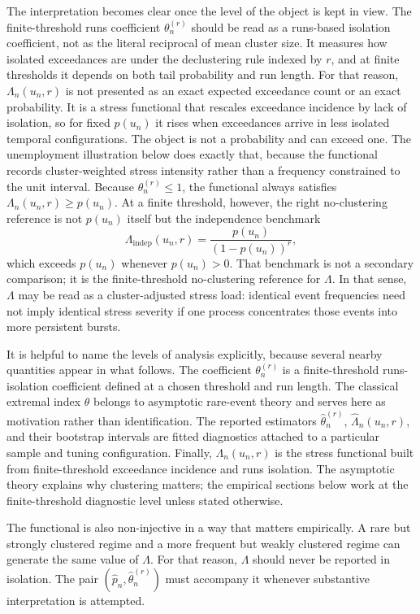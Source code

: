 \documentclass[11pt]{article}
\begin{document}
The interpretation becomes clear once the level of the object is kept in view. The finite-threshold runs coefficient $\theta_n^{(r)}$ should be read as a runs-based isolation coefficient, not as the literal reciprocal of mean cluster size. It measures how isolated exceedances are under the declustering rule indexed by $r$, and at finite thresholds it depends on both tail probability and run length. For that reason, $\Lambda_n(u_n,r)$ is not presented as an exact expected exceedance count or an exact probability. It is a stress functional that rescales exceedance incidence by lack of isolation, so for fixed $p(u_n)$ it rises when exceedances arrive in less isolated temporal configurations. The object is not a probability and can exceed one. The unemployment illustration below does exactly that, because the functional records cluster-weighted stress intensity rather than a frequency constrained to the unit interval. Because $\theta_n^{(r)} \le 1$, the functional always satisfies $\Lambda_n(u_n,r)\ge p(u_n)$. At a finite threshold, however, the right no-clustering reference is not $p(u_n)$ itself but the independence benchmark
\[
\Lambda_{\mathrm{indep}}(u_n,r)=\frac{p(u_n)}{(1-p(u_n))^r},
\]
which exceeds $p(u_n)$ whenever $p(u_n)>0$. That benchmark is not a secondary comparison; it is the finite-threshold no-clustering reference for $\Lambda$. In that sense, $\Lambda$ may be read as a cluster-adjusted stress load: identical event frequencies need not imply identical stress severity if one process concentrates those events into more persistent bursts.

It is helpful to name the levels of analysis explicitly, because several nearby quantities appear in what follows. The coefficient $\theta_n^{(r)}$ is a finite-threshold runs-isolation coefficient defined at a chosen threshold and run length. The classical extremal index $\theta$ belongs to asymptotic rare-event theory and serves here as motivation rather than identification. The reported estimators $\widehat{\theta}_n^{(r)}$, $\widehat{\Lambda}_n(u_n,r)$, and their bootstrap intervals are fitted diagnostics attached to a particular sample and tuning configuration. Finally, $\Lambda_n(u_n,r)$ is the stress functional built from finite-threshold exceedance incidence and runs isolation. The asymptotic theory explains why clustering matters; the empirical sections below work at the finite-threshold diagnostic level unless stated otherwise.

The functional is also non-injective in a way that matters empirically. A rare but strongly clustered regime and a more frequent but weakly clustered regime can generate the same value of $\Lambda$. For that reason, $\Lambda$ should never be reported in isolation. The pair $(\widehat{p}_n,\widehat{\theta}_n^{(r)})$ must accompany it whenever substantive interpretation is attempted.
\end{document}
